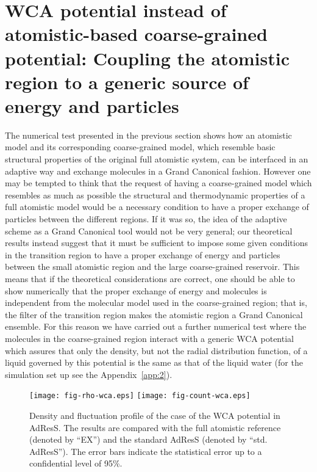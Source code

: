 \documentclass[aip,jcp,a4paper,reprint,onecolumn]{revtex4-1}
\begin{document}
\section{WCA potential instead of atomistic-based coarse-grained potential: Coupling the atomistic region to a generic source of energy and particles}
The numerical test presented in the previous section shows how an atomistic model and its corresponding coarse-grained model, which resemble basic structural properties of the original full atomistic system, can be interfaced in an adaptive way and exchange molecules in a Grand Canonical fashion. However one may be tempted to think that the request of having a coarse-grained model which resembles as much as possible the structural and thermodynamic properties of a full atomistic model would be a necessary condition to have a proper exchange of particles between the different regions. If it was so, the idea of the adaptive scheme as a Grand Canonical tool would not be very general; our theoretical results instead suggest that it must be sufficient to impose some given conditions in the transition region to have a proper exchange of energy and particles between the small atomistic region and the large coarse-grained reservoir. 
This means that if the theoretical considerations are correct, one should be able to show numerically that the proper exchange of energy and molecules is independent from the molecular model used in the coarse-grained region; that is, the filter of the transition region makes the atomistic region a Grand Canonical ensemble. For this reason we have carried out a further numerical test where the molecules in the coarse-grained region interact with a generic WCA potential which assures that only the density, but not the radial distribution function, of a liquid governed by this potential is the same as that of the liquid water (for the simulation set up see the Appendix~\ref{app:2}).
\begin{figure}
  \centering
  \texttt{[image: fig-rho-wca.eps]}
  \texttt{[image: fig-count-wca.eps]}
  \caption{Density and fluctuation profile of the case of the WCA potential in AdResS.  The
    results are compared with the full atomistic reference (denoted by
    ``EX'') and the  standard AdResS (denoted by ``std. AdResS'').
    The error bars indicate the statistical error up to a confidential
    level of 95\%.
  }
  \label{fig:wca-den}
\end{figure}
\end{document}
